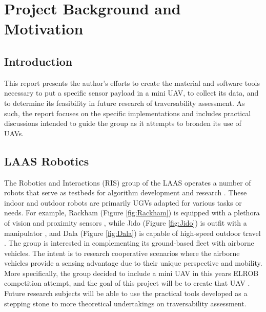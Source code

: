 \documentclass[a4paper,11pt]{report}
\begin{document}
\tableofcontents
\newpage

\chapter{Project Background and Motivation}

\section{Introduction}

This report presents the author's efforts to create the material and software tools necessary to put a specific sensor payload in a mini UAV, to collect its data, and to determine its feasibility in future research of traversability assessment.  As such, the report focuses on the specific implementations and includes practical discussions intended to guide the group as it attempts to broaden its use of UAVs.

\section{LAAS Robotics}

The Robotics and Interactions (RIS) group of the LAAS operates a number of robots that serve as testbeds for algorithm development and research \cite{ugvs}. These indoor and outdoor robots are primarily UGVs adapted for various tasks or needs. For example, Rackham (Figure \ref{fig:Rackham}) is equipped with a plethora of vision and proximity sensors \cite{rackham}, while Jido (Figure \ref{fig:Jido}) is outfit with a manipulator \cite{jido}, and Dala (Figure \ref{fig:Dala}) is capable of high-speed outdoor travel \cite{dala}. The group is interested in complementing its ground-based fleet with airborne vehicles. The intent is to research cooperative scenarios where the airborne vehicles provide a sensing advantage due to their unique perspective and mobility. More specifically, the group decided to include a mini UAV in this years ELROB competition attempt, and the goal of this project will be to create that UAV \cite{this}. Future research subjects will be able to use the practical tools developed as a stepping stone to more theoretical undertakings on traversability assessment.
\end{document}
